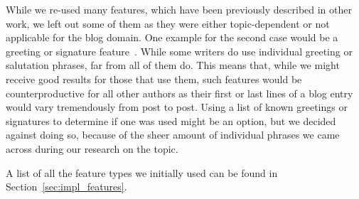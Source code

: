 While we re-used many features, which have been previously described in other work, we left out some of them as they were either topic-dependent or not applicable for the blog domain.
One example for the second case would be a greeting or signature feature~\cite{de2001mining}.
While some writers do use individual greeting or salutation phrases, far from all of them do.
This means that, while we might receive good results for those that use them, such features would be counterproductive for all other authors as their first or last lines of a blog entry would vary tremendously from post to post.
Using a list of known greetings or signatures to determine if one was used might be an option, but we decided against doing so, because of the sheer amount of individual phrases we came across during our research on the topic.

A list of all the feature types we initially used can be found in Section~\ref{sec:impl_features}.
